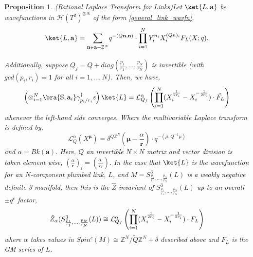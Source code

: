 \documentclass{article}
\newcommand{\Z}{{\mathbb Z}}
\def\be{\begin{equation}}
\def\ee{\end{equation}}
\newtheorem{proposition}{Proposition}[section]
\numberwithin{corollary}{theorem}
\numberwithin{corollary}{proposition}
\begin{document}
\begin{proposition}{(Rational Laplace Transform for Links)}\label{laplace_transform_links}
    Let $\ket{L,\mathbf{a}}$ be wavefunctions in $\mathcal{H}(T^2)^{\otimes N}$ of the form \eqref{general_link_wavfn}, 
    $$\ket{L,\mathbf{a}} = \underset{}{\sum_{\mathbf{n}\in \mathbf{a} + \Z^N}}  q^{-(Q\mathbf{n},\mathbf{n})} \cdot  \prod^N_{i=1} Y^{n_i}_i X_i^{(Q n)_i}F_L(X;q).$$
    Additionally, suppose $Q_f = Q+diag(\frac{p_1}{r_1}, \ldots,\frac{p_N}{r_N} )$ is invertible (with $gcd(p_i,r_i) =1$ for all $i=1,\ldots,N$).
    Then, we have, 
    \be \label{rational_link_surg}\left(\otimes^N_{i=1} \bra{\mathbb{S},\mathbf{a}_i} \gamma_{p_i/r_i}^\dagger s\right) \ket{L} = \mathcal{L}^\alpha_{Q_f} \left( \prod^N_{i=1}(X_i^{\frac{1}{2r_i}} - X_i^{-\frac{1}{2r_i}}) \cdot \tilde{F_L}\right)\ee
    whenever the left-hand side converges. Where the multivariable Laplace transform is defined by, 
    $$\mathcal{L}^\alpha_{Q}  (X^\mathbf{\mu}) = \delta^{Q \mathbb{Z}^N} (\mathbf{\mu} - \frac{\alpha}{\mathbf{r}}) \cdot q^{-(\mu,Q^{-1} \mu)}$$    
    and $\alpha = Bk(\mathbf{a})$. Here, $Q$ an invertible $N\times N $ matrix and vector division is taken element wise, $(\frac{\alpha}{\mathbf{r}})_i = (\frac{\alpha_i}{r_i})$.  In the case that $\ket{L}$ is the wavefunction for an $N$-component plumbed link, $L$, and $M = S^3_{\frac{p_1}{r_1},\ldots,\frac{p_N}{r_N}}(L)$ is a weakly negative definite 3-manifold, then this is the $\hat{Z}$ invariant of $S^3_{\frac{p_1}{r_1},\ldots, \frac{p_N}{r_N} } (L)$ up to an overall $\pm q^c$ factor,
    $$\Hat{Z}_\alpha (S^3_{\frac{p_1}{r_1},\ldots, \frac{p_N}{r_N} } (L)) \cong \mathcal{L}^\alpha_{Q_f} \left( \prod^N_{i=1}(X_i^{\frac{1}{2r_i}} - X_i^{-\frac{1}{2r_i}}) \cdot F_L\right) $$
    where $\alpha$ takes values in $Spin^c(M) \cong \Z^N/\tilde{Q}\Z^N +\delta$ described above and $F_L$ is the GM series of $L$.     
\end{proposition}
\end{document}
